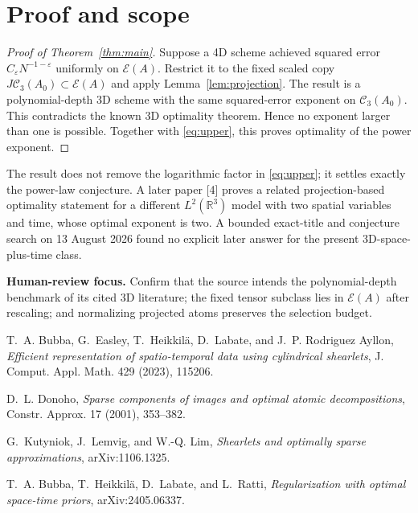 \documentclass[11pt]{article}
\newcommand{\R}{\mathbb R}
\newcommand{\E}{\mathcal E}
\newcommand{\C}{\mathcal C}
\begin{document}
\section{Proof and scope}

\begin{proof}[Proof of Theorem~\ref{thm:main}]
Suppose a 4D scheme achieved squared error
$C_\varepsilon N^{-1-\varepsilon}$ uniformly on $\E(A)$.  Restrict it to the
fixed scaled copy $J\C_3(A_0)\subset\E(A)$ and apply
Lemma~\ref{lem:projection}.  The result is a polynomial-depth 3D scheme with
the same squared-error exponent on $\C_3(A_0)$.  This contradicts the known
3D optimality theorem.  Hence no exponent larger than one is possible.
Together with \eqref{eq:upper}, this proves optimality of the power exponent.
\end{proof}

The result does not remove the logarithmic factor in \eqref{eq:upper}; it
settles exactly the power-law conjecture.  A later paper [4] proves a related
projection-based optimality statement for a different $L^2(\R^3)$ model with
two spatial variables and time, whose optimal exponent is two.  A bounded
exact-title and conjecture search on 13 August 2026 found no explicit later
answer for the present 3D-space-plus-time class.

\medskip\noindent\textbf{Human-review focus.}
Confirm that the source intends the polynomial-depth benchmark of its cited
3D literature; the fixed tensor subclass lies in $\E(A)$ after rescaling; and
normalizing projected atoms preserves the selection budget.

\medskip
{}\par\smallskip\small
\noindent[1] T.~A. Bubba, G.~Easley, T.~Heikkil\"a, D.~Labate, and
J.~P. Rodriguez Ayllon, \emph{Efficient representation of spatio-temporal data
using cylindrical shearlets}, J. Comput. Appl. Math. 429 (2023), 115206.\par
\noindent[2] D.~L. Donoho, \emph{Sparse components of images and optimal
atomic decompositions}, Constr. Approx. 17 (2001), 353--382.\par
\noindent[3] G.~Kutyniok, J.~Lemvig, and W.-Q. Lim, \emph{Shearlets and
optimally sparse approximations}, arXiv:1106.1325.\par
\noindent[4] T.~A. Bubba, T.~Heikkil\"a, D.~Labate, and L.~Ratti,
\emph{Regularization with optimal space-time priors}, arXiv:2405.06337.
\end{document}
